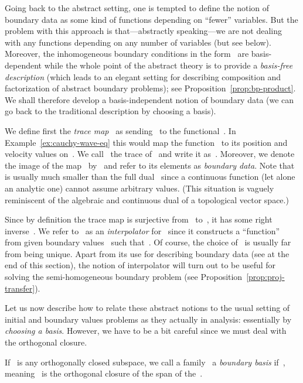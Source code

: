\documentclass[a4paper]{llncs}
\begin{document}
Going back to the abstract setting, one is tempted to define the notion of
boundary data as some kind of functions depending on ``fewer'' variables. But
the problem with this approach is that---abstractly speaking---we are not
dealing with any functions depending on any number of variables (but see
below). Moreover, the inhomogeneous boundary conditions in the
form~ are basis-dependent while the whole point of
the abstract theory is to provide a \emph{basis-free description} (which leads
to an elegant setting for describing composition and factorization of abstract
boundary problems); see Proposition~\ref{prop:bp-product}. We shall therefore
develop a basis-independent notion of boundary data (we can go back to the
traditional description by choosing a basis).

We define first the \emph{trace map}~ as
sending~ to the functional~. In
Example~\ref{ex:cauchy-wave-eq} this would map the function~ to its
position and velocity values on~. We call~ the trace
of~ and write it as~. Moreover, we denote the image of the map~
by~ and refer to its elements as \emph{boundary data}. Note
that~ is usually much smaller than the full dual~ since a
continuous function (let alone an analytic one) cannot assume arbitrary
values. (This situation is vaguely reminiscent of the algebraic and continuous
dual of a topological vector space.)

Since by definition the trace map is surjective from~ to~, it has
some right inverse~. We refer
to~ as an \emph{interpolator} for~ since it constructs a
``function''~ from given boundary values~ such that~. Of course, the choice of~ is usually
far from being unique. Apart from its use for describing boundary data (see at
the end of this section), the notion of interpolator will turn out to be useful
for solving the semi-homogeneous boundary problem (see
Proposition~\ref{prop:proj-transfer}).

Let us now describe how to relate these abstract notions to the usual
setting of initial and boundary values problems as they actually in
analysis: essentially by \emph{choosing a basis}. However, we have to
be a bit careful since we must deal with the orthogonal closure.

\begin{mydefinition}
  \label{def:boundary-basis}
  If~ is any orthogonally closed subspace, we call a
  family~ a \emph{boundary basis} if~, meaning~ is the orthogonal closure of the span of
  the~.
\end{mydefinition}
\end{document}
